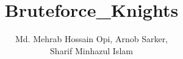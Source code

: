 \documentclass[8pt, a4paper, onesided]{article}
\title{\vspace{-2.5ex}Bruteforce_Knights}
\author{Md. Mehrab Hossain Opi, Arnob Sarker,\\Sharif Minhazul Islam}
\date{}
\begin{document}
\begin{landscape}
\begin{multicols*}{3}

\maketitle
\vspace{-7ex}
\tableofcontents
\pagestyle{fancy}
 
\raggedbottom



\end{multicols*}


\end{landscape}
\end{document}
